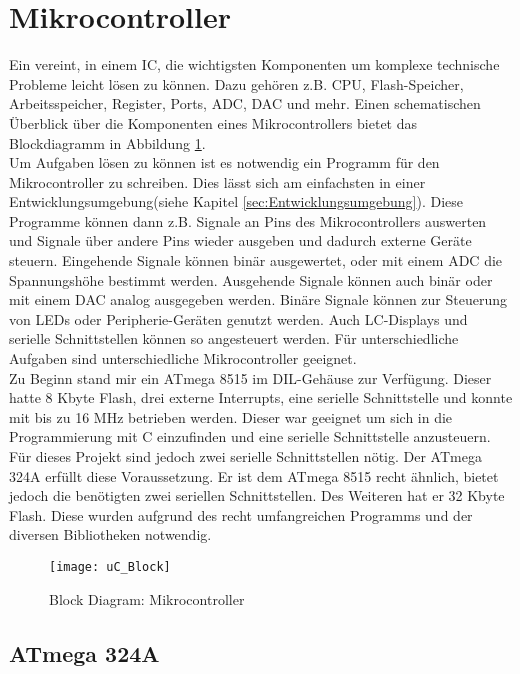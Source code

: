 \section{Mikrocontroller}
Ein  vereint, in einem IC, die wichtigsten Komponenten um komplexe technische Probleme leicht lösen zu können. Dazu gehören z.B. CPU, Flash-Speicher, Arbeitsspeicher, Register, Ports, ADC, DAC und mehr. Einen schematischen Überblick über die Komponenten eines Mikrocontrollers bietet das Blockdiagramm in Abbildung \ref{fig:uC_Blockdiagramm}. \\
Um Aufgaben lösen zu können ist es notwendig ein Programm für den Mikrocontroller zu schreiben. Dies lässt sich am einfachsten in einer Entwicklungsumgebung(siehe Kapitel \ref{sec:Entwicklungsumgebung}). Diese Programme können dann z.B. Signale an Pins des Mikrocontrollers auswerten und Signale über andere Pins wieder ausgeben und dadurch externe Geräte steuern. Eingehende Signale können binär ausgewertet,  oder mit einem ADC die Spannungshöhe bestimmt werden. Ausgehende Signale können auch binär oder mit einem DAC analog ausgegeben werden. Binäre Signale können zur Steuerung von LEDs oder Peripherie-Geräten genutzt werden. Auch LC-Displays und serielle Schnittstellen können so angesteuert werden.
Für unterschiedliche Aufgaben sind unterschiedliche Mikrocontroller geeignet.\\
Zu Beginn stand mir ein ATmega 8515\cite{atmel:8515} im DIL-Gehäuse zur Verfügung. Dieser hatte 8 Kbyte Flash, drei externe Interrupts, eine serielle Schnittstelle und konnte mit bis zu 16 MHz betrieben werden. 
Dieser war geeignet um sich in die Programmierung mit C einzufinden und eine serielle Schnittstelle anzusteuern. \\
Für dieses Projekt sind jedoch zwei serielle Schnittstellen nötig. Der ATmega 324A\cite{atmel:324A} erfüllt diese Voraussetzung. Er ist dem ATmega 8515 recht ähnlich, bietet jedoch die benötigten zwei seriellen Schnittstellen. Des Weiteren hat er 32 Kbyte Flash. Diese wurden aufgrund des recht umfangreichen Programms und der diversen Bibliotheken notwendig.
\begin{figure}[htb]
\centering
\texttt{[image: uC\_Block]}
\caption{Block Diagram: Mikrocontroller}
\label{fig:uC_Blockdiagramm}
\citep{atmel:ug_324A}
\end{figure}
\subsection{ATmega 324A}
